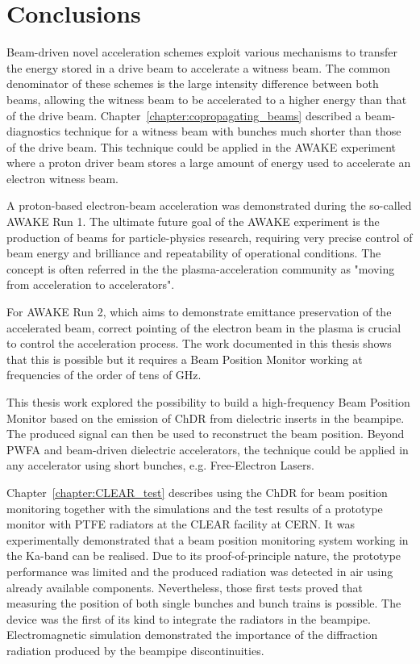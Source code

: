 \chapter[Conclusions]{Conclusions}

Beam-driven novel acceleration schemes exploit various mechanisms to transfer the energy stored in a drive beam to accelerate a witness beam. The common denominator of these schemes is the large intensity difference between both beams, allowing the witness beam to be accelerated to a higher energy than that of the drive beam. Chapter~\ref{chapter:copropagating_beams} described a beam-diagnostics technique for a witness beam with bunches much shorter than those of the drive beam. This technique could be applied in the AWAKE experiment where a proton driver beam  stores a large amount of energy used to accelerate an electron witness beam.

A proton-based electron-beam acceleration was demonstrated during the so-called AWAKE Run 1. The ultimate future goal of the AWAKE experiment is the production of beams for particle-physics research, requiring very precise control of beam energy and brilliance and repeatability of operational conditions. The concept is often referred in the the plasma-acceleration community as "moving from acceleration to accelerators". 

For AWAKE Run 2, which aims to demonstrate emittance preservation of the accelerated beam, correct pointing of the electron beam in the plasma is crucial to control the acceleration process. The work documented in this thesis shows that this is possible but it requires a Beam Position Monitor working at frequencies of the order of tens of GHz.

This thesis work explored the possibility to build a high-frequency Beam Position Monitor based on the emission of ChDR from dielectric inserts in the beampipe. The produced signal can then be used to reconstruct the beam position. Beyond PWFA and beam-driven dielectric accelerators, the technique could be applied in any accelerator using short bunches, e.g. Free-Electron Lasers.

Chapter~\ref{chapter:CLEAR_test} describes using the ChDR for beam position monitoring together with the simulations and the test results of a prototype monitor with PTFE radiators at the CLEAR facility at CERN. It was experimentally demonstrated that a beam position monitoring system working in the Ka-band can be realised. Due to its proof-of-principle nature, the prototype performance was limited and the produced radiation was detected in air using already available components. Nevertheless, those first tests proved that measuring the position of both single bunches and bunch trains is possible. The device was the first of its kind to integrate the radiators in the beampipe. Electromagnetic simulation demonstrated the importance of the diffraction radiation produced by the beampipe discontinuities.

